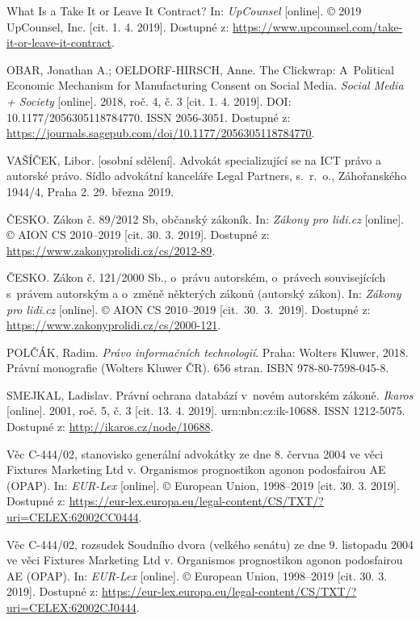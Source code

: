 \documentclass[thesis=B,czech]{FITthesis}[2012/06/26]
\begin{document}
\begin{thebibliography}{99}
	What Is a Take It or Leave It Contract? In: \textit{UpCounsel} [online]. © 2019 UpCounsel, Inc. [cit. 1. 4. 2019]. Dostupné z: \url{https://www.upcounsel.com/take-it-or-leave-it-contract}.
	
	OBAR, Jonathan A.; OELDORF-HIRSCH, Anne. The Clickwrap: A~Political Economic Mechanism for Manufacturing Consent on Social Media. \textit{Social Media + Society} [online]. 2018, roč. 4, č. 3 [cit. 1. 4. 2019]. DOI: 10.1177/2056305118784770. ISSN 2056-3051. Dostupné z: \url{https://journals.sagepub.com/doi/10.1177/2056305118784770}.
	
	VAŠÍČEK, Libor. [osobní sdělení]. Advokát specializující se na ICT právo a autorské právo. Sídlo advokátní kanceláře Legal Partners, s.~r.~o., Záhořanského 1944/4, Praha 2. 29. března 2019.
	
	ČESKO. Zákon č. 89/2012 Sb, občanský zákoník. In: \textit{Zákony pro lidi.cz} [online]. © AION CS 2010--2019 [cit. 30. 3. 2019]. Dostupné z: \url{https://www.zakonyprolidi.cz/cs/2012-89}.
	
	ČESKO. Zákon č. 121/2000 Sb., o~právu autorském, o~právech souvisejících s~právem autorským a o~změně některých zákonů (autorský zákon). In: \textit{Zákony pro lidi.cz} [online]. © AION CS 2010--2019 [cit.~30.~3.~2019]. Dostupné z: \url{https://www.zakonyprolidi.cz/cs/2000-121}.
	
	POLČÁK, Radim. \textit{Právo informačních technologií}. Praha: Wolters Kluwer, 2018. Právní monografie (Wolters Kluwer ČR). 656 stran. ISBN 978-80-7598-045-8.
	
	SMEJKAL, Ladislav. Právní ochrana databází v~novém autorském zákoně. \textit{Ikaros} [online]. 2001, roč. 5, č. 3 [cit. 13. 4. 2019]. urn:nbn:cz:ik-10688. ISSN 1212-5075. Dostupné z: \url{http://ikaros.cz/node/10688}.
	
	Věc C-444/02, stanovisko generální advokátky ze dne 8. června 2004 ve věci Fixtures Marketing Ltd v. Organismos prognostikon agonon podosfairou AE (OPAP). In: \textit{EUR-Lex} [online]. © European Union, 1998--2019 [cit. 30. 3. 2019]. Dostupné z: \url{https://eur-lex.europa.eu/legal-content/CS/TXT/?uri=CELEX:62002CC0444}.
	
	Věc C-444/02, rozsudek Soudního dvora (velkého senátu) ze dne 9. listopadu 2004 ve věci Fixtures Marketing Ltd v. Organismos prognostikon agonon podosfairou AE (OPAP). In: \textit{EUR-Lex} [online]. © European Union, 1998--2019 [cit. 30. 3. 2019]. Dostupné z: \url{https://eur-lex.europa.eu/legal-content/CS/TXT/?uri=CELEX:62002CJ0444}.
	

\end{thebibliography}
\end{document}
